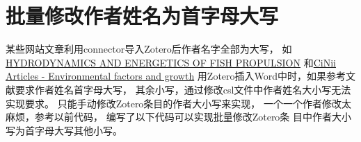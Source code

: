 \documentclass[cn,11pt,chinese]{elegantbook}
\begin{document}
		\section{批量修改作者姓名为首字母大写}\label{sec:authorUpper}
			某些网站文章利用connector导入Zotero后作者名字全部为大写，
			如\href{https://pascal-francis.inist.fr/vibad/index.php?action=getRecordDetail&idt=PASCAL7536509928}
			{HYDRODYNAMICS AND ENERGETICS OF FISH PROPULSION}
			和\href{https://ci.nii.ac.jp/naid/10008557972/}
			{CiNii Articles - Environmental factors and growth}
			用Zotero插入Word中时，如果参考文献要求作者姓名首字母大写，
			其余小写，通过修改csl文件中作者姓名大小写无法实现要求。
			只能手动修改Zotero条目的作者大小写来实现，
			一个一个作者修改太麻烦，参考以前代码，
			编写了以下代码可以实现批量修改Zotero条
			目中作者大小写为首字母大写其他小写。
			
\end{document}
